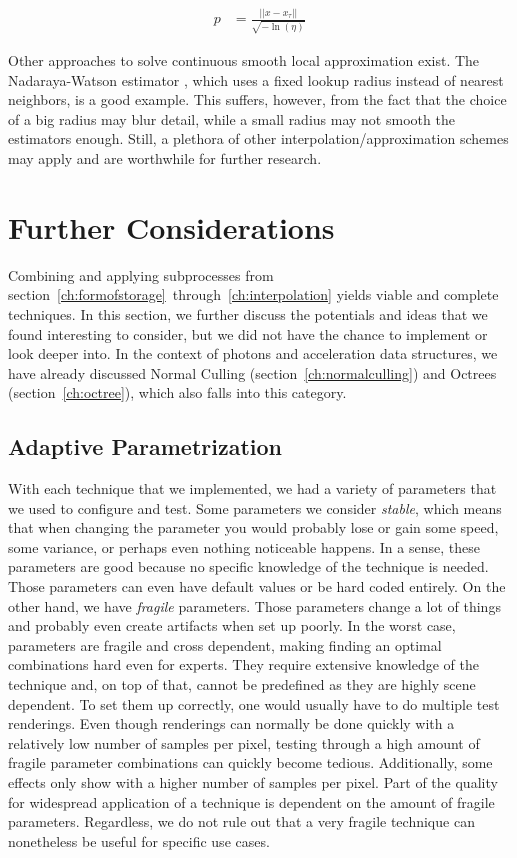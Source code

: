 \begin{align}
p &= \frac{||x-x_\tau||}{\sqrt{-\ln(\eta)}} \label{eq:p0}
\end{align}

Other approaches to solve continuous smooth local approximation exist. The Nadaraya-Watson estimator \parencite{nadaraya1964estimating}, which uses a fixed lookup radius instead of nearest neighbors, is a good example. This suffers, however, from the fact that the choice of a big radius may blur detail, while a small radius may not smooth the estimators enough. Still, a plethora of other interpolation/approximation schemes may apply and are worthwhile for further research.


\section{Further Considerations}
\label{sec:futhercons}
Combining and applying subprocesses from section~\ref{ch:formofstorage}~through~\ref{ch:interpolation} yields viable and complete techniques. In this section, we further discuss the potentials and ideas that we found interesting to consider, but we did not have the chance to implement or look deeper into. In the context of photons and acceleration data structures, we have already discussed Normal Culling (section~\ref{ch:normalculling}) and Octrees (section~\ref{ch:octree}), which also falls into this category.

\subsection{Adaptive Parametrization}

With each technique that we implemented, we had a variety of parameters that we used to configure and test. Some parameters we consider \textit{stable}, which means that when changing the parameter you would probably lose or gain some speed, some variance, or perhaps even nothing noticeable happens. In a sense, these parameters are good because no specific knowledge of the technique is needed. Those parameters can even have default values or be hard coded entirely. On the other hand, we have \textit{fragile} parameters. Those parameters change a lot of things and probably even create artifacts when set up poorly. In the worst case, parameters are fragile and cross dependent, making finding an optimal combinations hard even for experts. They require extensive knowledge of the technique and, on top of that, cannot be predefined as they are highly scene dependent. To set them up correctly, one would usually have to do multiple test renderings. Even though renderings can normally be done quickly with a relatively low number of samples per pixel, testing through a high amount of fragile parameter combinations can quickly become tedious. Additionally, some effects only show with a higher number of samples per pixel. Part of the quality for widespread application of a technique is dependent on the amount of fragile parameters. Regardless, we do not rule out that a very fragile technique can nonetheless be useful for specific use cases.

